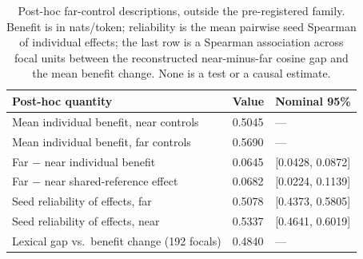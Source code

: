 \begin{table}[tp]
\centering
\small
\begin{tabular}{@{}lll@{}}
\toprule
Post-hoc quantity & Value & Nominal 95\% \\
\midrule
Mean individual benefit, near controls & 0.5045 & --- \\
Mean individual benefit, far controls & 0.5690 & --- \\
Far $-$ near individual benefit & 0.0645 & [0.0428, 0.0872] \\
Far $-$ near shared-reference effect & 0.0682 & [0.0224, 0.1139] \\
Seed reliability of effects, far & 0.5078 & [0.4373, 0.5805] \\
Seed reliability of effects, near & 0.5337 & [0.4641, 0.6019] \\
Lexical gap vs.\ benefit change (192 focals) & 0.4840 & --- \\
\bottomrule
\end{tabular}
\caption{Post-hoc far-control descriptions, outside the pre-registered family. Benefit is in nats/token; reliability is the mean pairwise seed Spearman of individual effects; the last row is a Spearman association across focal units between the reconstructed near-minus-far cosine gap and the mean benefit change. None is a test or a causal estimate.}
\label{tab:e01_posthoc}
\end{table}
